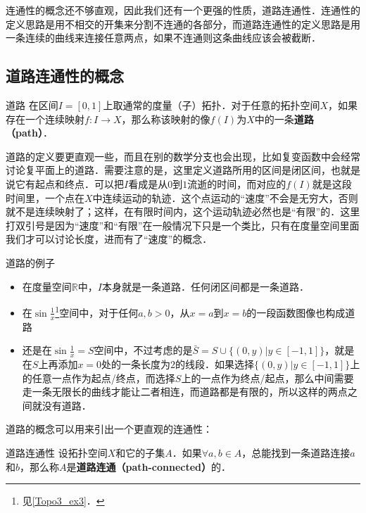 
连通性的概念还不够直观，因此我们还有一个更强的性质，道路连通性．连通性的定义思路是用不相交的开集来分割不连通的各部分，而道路连通性的定义思路是用一条连续的曲线来连接任意两点，如果不连通则这条曲线应该会被截断．

\subsection{道路连通性的概念}
\begin{definition}{道路}\label{Topo4_def1}
在区间$I=[0,1]$上取通常的度量（子）拓扑．对于任意的拓扑空间$X$，如果存在一个连续映射$f: I\rightarrow X$，那么称该映射的像$f(I)$为$X$中的一条\textbf{道路（path）}．
\end{definition}

道路的定义要更直观一些，而且在别的数学分支也会出现，比如复变函数中会经常讨论复平面上的道路．需要注意的是，这里定义道路所用的区间是闭区间，也就是说它有起点和终点．可以把$I$看成是从$0$到$1$流逝的时间，而对应的$f(I)$就是这段时间里，一个点在$X$中连续运动的轨迹．这个点运动的“速度”不会是无穷大，否则就不是连续映射了；这样，在有限时间内，这个运动轨迹必然也是“有限”的．这里打双引号是因为“速度”和“有限”在一般情况下只是一个类比，只有在度量空间里面我们才可以讨论长度，进而有了“速度”的概念．

\begin{example}{道路的例子}\label{Topo4_ex1}
\begin{itemize}
\item 在度量空间$\mathbb{R}$中，$I$本身就是一条道路．任何闭区间都是一条道路．
\item 在$\sin{\frac{1}{x}}$\footnote{见\autoref{Topo3_ex3}．}空间中，对于任何$a, b>0$，从$x=a$到$x=b$的一段函数图像也构成道路
\item 还是在$\sin{\frac{1}{x}}=S$空间中，不过考虑的是$\bar{S}=S\cup\{(0, y)|y\in [-1,1]\}$，就是在$S$上再添加$x=0$处的一条长度为$2$的线段．如果选择$\{(0, y)|y\in [-1,1]\}$上的任意一点作为起点/终点，而选择$S$上的一点作为终点/起点，那么中间需要走一条无限长的曲线才能让二者相连，而道路都是有限的，所以这样的两点之间就没有道路．

\end{itemize}
\end{example}

道路的概念可以用来引出一个更直观的连通性：

\begin{definition}{道路连通性}\label{Topo4_def2}
设拓扑空间$X$和它的子集$A$．如果$\forall a, b\in A$，总能找到一条道路连接$a$和$b$，那么称$A$是\textbf{道路连通（path-connected）}的．
\end{definition}

